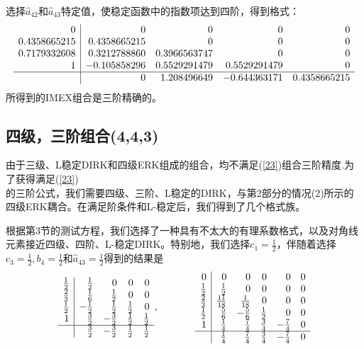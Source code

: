 \documentclass[12pt,a4paper]{article}
\numberwithin{equation}{section}
\begin{document}
选择$\widehat{a}_{42}$和$\widehat{a}_{43}$特定值，使稳定函数中的指数项达到四阶，得到格式：
\[
\begin{array}{r|rrrr}
0 & 0 & 0 & 0 & 0 \\
0.4358665215 & 0.4358665215 & 0 &  0 & 0\\
0.7179332608 & 0.3212788860 & 0.3966563747 & 0 & 0\\
1 & -0.105858296 & 0.5529291479 & 0.5529291479 & 0\\
\hline
& 0 & 1.208496649 & -0.644363171 & 0.4358665215
\end{array}
\]
所得到的IMEX组合是三阶精确的。

\subsection{四级，三阶组合(4,4,3)}

由于三级、L稳定DIRK和四级ERK组成的组合，均不满足(\ref{23})组合三阶精度.为了获得满足(\ref{23})\\的三阶公式，我们需要四级、三阶、L稳定的DIRK，与第2部分的情况(2)所示的四级ERK耦合。在满足阶条件和L-稳定后，我们得到了几个格式族。

根据第3节的测试方程，我们选择了一种具有不太大的有理系数格式，以及对角线元素接近四级、四阶、L-稳定DIRK。特别地，我们选择$c_{1}=\frac{1}{2}$，伴随着选择$c_{3}=\frac{1}{2},b_{4}=\frac{1}{2}$和$\widehat{a}_{43}=\frac{1}{2}$得到的结果是
\[
\begin{array}{r|rrrr}
\frac{1}{2} & \frac{1}{2} & 0 & 0 & 0\\
\frac{2}{3} & \frac{1}{6} & \frac{1}{2} & 0 & 0 \\
\frac{1}{2} & -\frac{1}{2} & \frac{1}{2} & \frac{1}{2} & 0 \\
1 & \frac{3}{2} & -\frac{3}{2} & \frac{1}{2} & \frac{1}{2} \\
\hline
& \frac{3}{2} & -\frac{3}{2} & \frac{1}{2} & \frac{1}{2} 
\end{array},~~~~~~~~~~~
\begin{array}{r|rrrrr}
0 & 0 & 0 & 0 & 0 & 0 \\
\frac{1}{2} & \frac{1}{2} & 0 & 0 & 0 & 0\\
\frac{2}{3} & \frac{11}{18} & \frac{1}{18} & 0 & 0 & 0\\
\frac{1}{2} & \frac{5}{6} & -\frac{5}{6} & \frac{1}{2} & 0 & 0\\
1 & \frac{1}{4} & \frac{7}{4} & \frac{3}{4} & -\frac{7}{4} & 0\\
\hline
& \frac{1}{4} & \frac{7}{4} & \frac{3}{4} & -\frac{7}{4} & 0
\end{array}
\]
\end{document}
